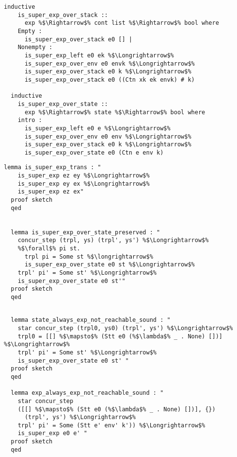 \documentclass{article}
\begin{document}
\begin{lstlisting}[style=codestyle1, escapechar=\%]
  inductive
    is_super_exp_over_stack ::
      exp %$\Rightarrow$% cont list %$\Rightarrow$% bool where
    Empty :
      is_super_exp_over_stack e0 [] |
    Nonempty :
      is_super_exp_left e0 ek %$\Longrightarrow$%
      is_super_exp_over_env e0 envk %$\Longrightarrow$%
      is_super_exp_over_stack e0 k %$\Longrightarrow$%
      is_super_exp_over_stack e0 ((Ctn xk ek envk) # k)

  inductive
    is_super_exp_over_state ::
      exp %$\Rightarrow$% state %$\Rightarrow$% bool where
    intro :
      is_super_exp_left e0 e %$\Longrightarrow$%
      is_super_exp_over_env e0 env %$\Longrightarrow$%
      is_super_exp_over_stack e0 k %$\Longrightarrow$%
      is_super_exp_over_state e0 (Ctn e env k)

  \end{lstlisting}

\begin{lstlisting}[style=codestyle1, escapechar=\%]
  lemma is_super_exp_trans : "
    is_super_exp ez ey %$\Longrightarrow$%
    is_super_exp ey ex %$\Longrightarrow$%
    is_super_exp ez ex"
  proof sketch 
  qed


  lemma is_super_exp_over_state_preserved : "
    concur_step (trpl, ys) (trpl', ys') %$\Longrightarrow$%
    %$\forall$% pi st.
      trpl pi = Some st %$\longrightarrow$%
      is_super_exp_over_state e0 st %$\Longrightarrow$%
    trpl' pi' = Some st' %$\Longrightarrow$%
    is_super_exp_over_state e0 st'"
  proof sketch 
  qed
  \end{lstlisting}


\begin{lstlisting}[style=codestyle1, escapechar=\%]

  lemma state_always_exp_not_reachable_sound : "
    star concur_step (trpl0, ys0) (trpl', ys') %$\Longrightarrow$%
    trpl0 = [[] %$\mapsto$% (Stt e0 (%$\lambda$% _ . None) [])] %$\Longrightarrow$%
    trpl' pi' = Some st' %$\Longrightarrow$%
    is_super_exp_over_state e0 st' "
  proof sketch
  qed

  lemma exp_always_exp_not_reachable_sound : "
    star concur_step
    ([[] %$\mapsto$% (Stt e0 (%$\lambda$% _ . None) [])], {})
      (trpl', ys') %$\Longrightarrow$%
    trpl' pi' = Some (Stt e' env' k')) %$\Longrightarrow$%
    is_super_exp e0 e' " 
  proof sketch
  qed

  \end{lstlisting}
\end{document}
